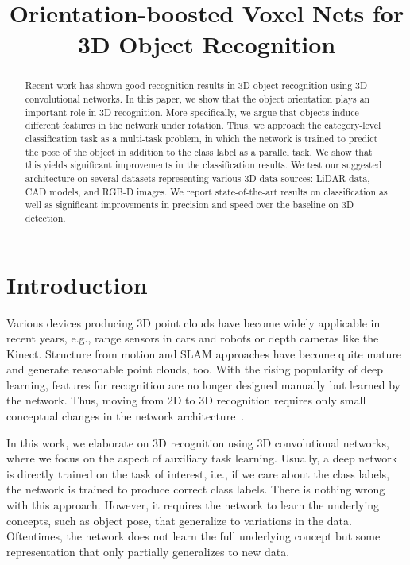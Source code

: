 \documentclass{bmvc2k}
\title{Orientation-boosted Voxel Nets for 3D Object Recognition}
\begin{document}
\maketitle


\begin{abstract}
Recent work has shown good recognition results in 3D object recognition using 3D convolutional networks.
In this paper, we show that the object orientation plays an important role in 3D recognition.
More specifically, we argue that objects induce different features in the network under rotation.
Thus, we approach the category-level classification task as a multi-task problem, in which the network is trained to predict the pose of the object in addition to the class label as a parallel task. We show that this yields significant improvements in the classification results.
We test our suggested architecture on several datasets representing various 3D data sources: LiDAR data, CAD models, and RGB-D images. We report state-of-the-art results on classification as well as significant improvements in precision and speed over the baseline on 3D detection.
\end{abstract}


\section{Introduction}

Various devices producing 3D point clouds have become widely applicable in recent years, e.g., range sensors in cars and robots or depth cameras like the Kinect. Structure from motion and SLAM approaches have become quite mature and generate reasonable point clouds, too.
With the rising popularity of deep learning, features for recognition are no longer designed manually but learned by the network. Thus, moving from 2D to 3D recognition requires only small conceptual changes in the network architecture~\cite{wu_3D_2015,maturana_voxnet_2015}. 


In this work, we elaborate on 3D recognition using 3D convolutional networks, where we focus on the aspect of auxiliary task learning. Usually, a deep network is directly trained on the task of interest, i.e., if we care about the class labels, the network is trained to produce correct class labels.
There is nothing wrong with this approach. However, it requires the network to learn the underlying concepts, such as object pose, that generalize to variations in the data. Oftentimes, the network does not learn the full underlying concept but some representation that only partially generalizes to new data. 
\end{document}
